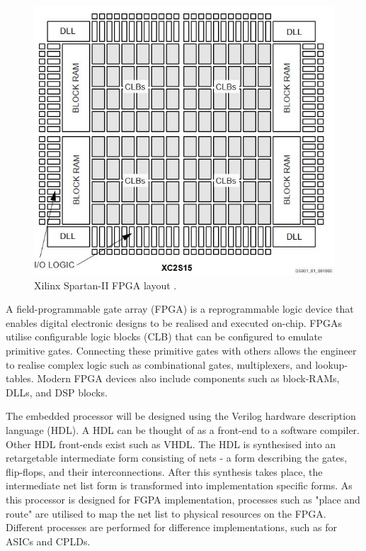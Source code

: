 \documentclass[11pt,a4paper]{report}
\begin{document}
\begin{figure}[H]
\begin{center}
\includegraphics[scale=0.4]{fpga}
\end{center}
\caption{Xilinx Spartan-II FPGA layout \citep{spartan2}.}
\label{fig:}
\end{figure}

A field-programmable gate array (FPGA) is a reprogrammable logic device that enables digital electronic designs to be realised and executed on-chip. FPGAs utilise configurable logic blocks (CLB) that can be configured to emulate primitive gates. Connecting these primitive gates with others allows the engineer to realise complex logic such as combinational gates, multiplexers, and lookup-tables. Modern FPGA devices also include components such as block-RAMs, DLLs, and DSP blocks.

The embedded processor will be designed using the Verilog hardware description language (HDL). A HDL can be thought of as a front-end to a software compiler. Other HDL front-ends exist such as VHDL. The HDL is synthesised into an retargetable intermediate form consisting of nets - a form describing the gates, flip-flops, and their interconnections. After this synthesis takes place, the intermediate net list form is transformed into implementation specific forms. As this processor is designed for FGPA implementation, processes such as "place and route" are utilised to map the net list to physical resources on the FPGA. Different processes are performed for difference implementations, such as for ASICs and CPLDs.
\end{document}
